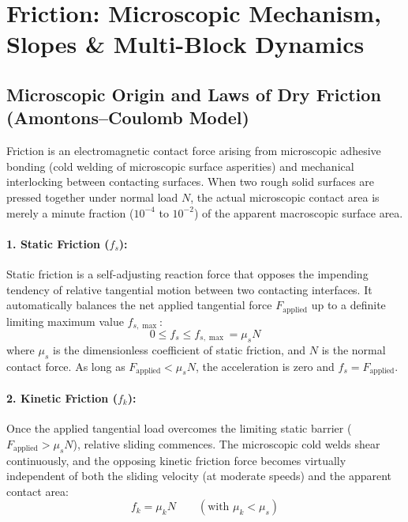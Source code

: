 \documentclass[10pt,twoside,openright]{book}
\begin{document}
\section{Friction: Microscopic Mechanism, Slopes \& Multi-Block Dynamics}

\subsection{Microscopic Origin and Laws of Dry Friction (Amontons--Coulomb Model)}
Friction is an electromagnetic contact force arising from microscopic adhesive bonding (cold welding of microscopic surface asperities) and mechanical interlocking between contacting surfaces. When two rough solid surfaces are pressed together under normal load $N$, the actual microscopic contact area is merely a minute fraction ($10^{-4}$ to $10^{-2}$) of the apparent macroscopic surface area.

\paragraph{1. Static Friction ($f_s$):} Static friction is a self-adjusting reaction force that opposes the impending tendency of relative tangential motion between two contacting interfaces. It automatically balances the net applied tangential force $F_{\text{applied}}$ up to a definite limiting maximum value $f_{s,\max}$:
\begin{equation}
  0 \le f_s \le f_{s,\max} = \mu_s N
\end{equation}
where $\mu_s$ is the dimensionless coefficient of static friction, and $N$ is the normal contact force. As long as $F_{\text{applied}} < \mu_s N$, the acceleration is zero and $f_s = F_{\text{applied}}$.

\paragraph{2. Kinetic Friction ($f_k$):} Once the applied tangential load overcomes the limiting static barrier ($F_{\text{applied}} > \mu_s N$), relative sliding commences. The microscopic cold welds shear continuously, and the opposing kinetic friction force becomes virtually independent of both the sliding velocity (at moderate speeds) and the apparent contact area:
\begin{equation}
  f_k = \mu_k N \qquad (\text{with } \mu_k < \mu_s)
\end{equation}
\end{document}
